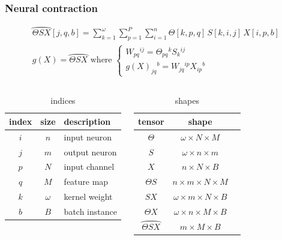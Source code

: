 \documentclass[t,9pt,pdftex]{beamer}
\theoremstyle{definition}
\newcommand{\h}[1]{\hspace{#1pt}}
\begin{document}
\begin{frame}[c, label=current]
  \frametitle{Neural contraction}

\begin{gather*}
\wideparen{\Theta SX}[j,q,b] = \displaystyle \sum_{k=1}^\omega \sum_{p=1}^P \sum_{i=1}^n \Theta[k,p,q] \h{2} S[k,i,j] \h{2} X[i,p,b]\\
g(X) = \wideparen{\Theta SX}
\text{ where } \begin{cases} W_{pq}\h{0}^{ij} = \Theta_{pq}\h{0}^k S_k\h{0}^{ij} \\ g(X)_{jq}\h{0}^b = W_{jq}\h{0}^{ip} X_{ip}\h{0}^{b} \end{cases} \label{eq:ternary}
\end{gather*}


\begin{columns}

    \begin{center}
    \begin{table}[H]
    \centering
    \begin{tabular}{ccl}
      index & size & description\\
      \hline
      $i$ & $n$ & input neuron\\
      $j$ & $m$ & output neuron\\
      $p$ & $N$ & input channel\\
      $q$ & $M$ & feature map\\
      $k$ & $\omega$ & kernel weight\\
      $b$ & $B$ & batch instance
    \end{tabular}
    \caption{indices}
    \label{tab:ind}
    \end{table}
    \end{center}


    \begin{center}
    \begin{table}[H]
    \centering
    \begin{tabular}{ccc}
      tensor & shape\\
      \hline
      $\Theta$ & $\omega \times N \times M$\\
      $S$ & $\omega \times n \times m$\\
      $X$ & $n \times N \times B$\\
      $\Theta S$ & $n \times m \times N \times M$\\
      $SX$ & $\omega \times m \times N \times B$\\
      $\Theta X$ & $\omega \times n \times M \times B$\\
      $\wideparen{\Theta SX}$ & $m \times M \times B$
    \end{tabular}
    \caption{shapes}
    \label{tab:mid}
    \end{table}
    \end{center}
    

\end{columns}
\end{frame}
\end{document}
